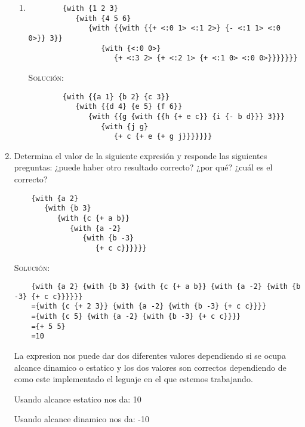 \documentclass[letterpaper,11pt]{article}
\begin{document}
\begin{enumerate}
\begin{enumerate}
        \item 
        \begin{verbatim}
        {with {1 2 3} 
           {with {4 5 6} 
              {with {{with {{+ <:0 1> <:1 2>} {- <:1 1> <:0 0>}} 3}} 
              	 {with {<:0 0>}
                 	{+ <:3 2> {+ <:2 1> {+ <:1 0> <:0 0>}}}}}}}
        \end{verbatim}

        \textsc{Solución:}
        \begin{verbatim}
        {with {{a 1} {b 2} {c 3}} 
           {with {{d 4} {e 5} {f 6}} 
              {with {{g {with {{h {+ e c}} {i {- b d}}} 3}}}
              	 {with {j g}
                 	{+ c {+ e {+ g j}}}}}}}
        \end{verbatim}
    \end{enumerate}

    \item Determina el valor de la siguiente expresión y responde las siguientes 
    preguntas: ¿puede haber otro resultado correcto? ¿por qué? ¿cuál es el 
    correcto? 
    \begin{verbatim}
    {with {a 2} 
       {with {b 3} 
          {with {c {+ a b}} 
             {with {a -2} 
                {with {b -3} 
                   {+ c c}}}}}}
    \end{verbatim}

    \textsc{Solución:} 
    \begin{verbatim}
    {with {a 2} {with {b 3} {with {c {+ a b}} {with {a -2} {with {b -3} {+ c c}}}}}}
    ={with {c {+ 2 3}} {with {a -2} {with {b -3} {+ c c}}}}
    ={with {c 5} {with {a -2} {with {b -3} {+ c c}}}}
    ={+ 5 5}
    =10
    \end{verbatim}
    La expresion nos puede dar dos diferentes valores dependiendo si se ocupa alcance dinamico 	
    o estatico y los dos valores son correctos dependiendo de como este implementado el leguaje 
    en el que estemos trabajando.
    
    Usando alcance estatico nos da:  10
    
    Usando alcance dinamico nos da: -10
\end{enumerate}
\end{document}
